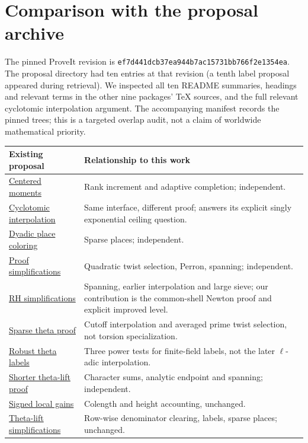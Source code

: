 \documentclass[11pt]{article}
\newcommand{\propbase}{https://github.com/VladimirReshetnikov/ProveIt/tree/ef7d441dcb37ea944b7ac15731bb766f2e1354ea/Analysis/GeneralizedRiemannHypothesis/docs/proposals}
\begin{document}
\section{Comparison with the proposal archive}\label{sec:audit}
The pinned ProveIt revision is \texttt{ef7d441dcb37ea944b7ac15731bb766f2e1354ea}. The proposal directory had ten entries at that revision (a tenth label proposal appeared during retrieval). We inspected all ten README summaries, headings and relevant terms in the other nine packages' TeX sources, and the full relevant cyclotomic interpolation argument. The accompanying manifest records the pinned trees; this is a targeted overlap audit, not a claim of worldwide mathematical priority.
\begin{center}\small
\begin{tabular}{>{\raggedright\arraybackslash}p{.40\linewidth}p{.52\linewidth}}
\toprule
Existing proposal & Relationship to this work\\\midrule
\href{\propbase/centered_theta_lift_simplification}{Centered moments} & Rank increment and adaptive completion; independent.\\
\href{\propbase/cyclotomic-interpolation-and-theta-lifts}{Cyclotomic interpolation} & Same interface, different proof; answers its explicit singly exponential ceiling question.\\
\href{\propbase/dyadic_place_coloring}{Dyadic place coloring} & Sparse places; independent.\\
\href{\propbase/proof_simplifications}{Proof simplifications} & Quadratic twist selection, Perron, spanning; independent.\\
\href{\propbase/rh-simplifications}{RH simplifications} & Spanning, earlier interpolation and large sieve; our contribution is the common-shell Newton proof and explicit improved level.\\
\href{\propbase/rh_sparse_theta_proof}{Sparse theta proof} & Cutoff interpolation and averaged prime twist selection, not torsion specialization.\\
\href{\propbase/robust_theta_labels}{Robust theta labels} & Three power tests for finite-field labels, not the later $\ell$-adic interpolation.\\
\href{\propbase/shorter-theta-lift-proof}{Shorter theta-lift proof} & Character sums, analytic endpoint and spanning; independent.\\
\href{\propbase/signed_theta_gain_simplification}{Signed local gains} & Colength and height accounting, unchanged.\\
\href{\propbase/theta-lift-simplifications}{Theta-lift simplifications} & Row-wise denominator clearing, labels, sparse places; unchanged.\\\bottomrule
\end{tabular}
\end{center}
\end{document}
